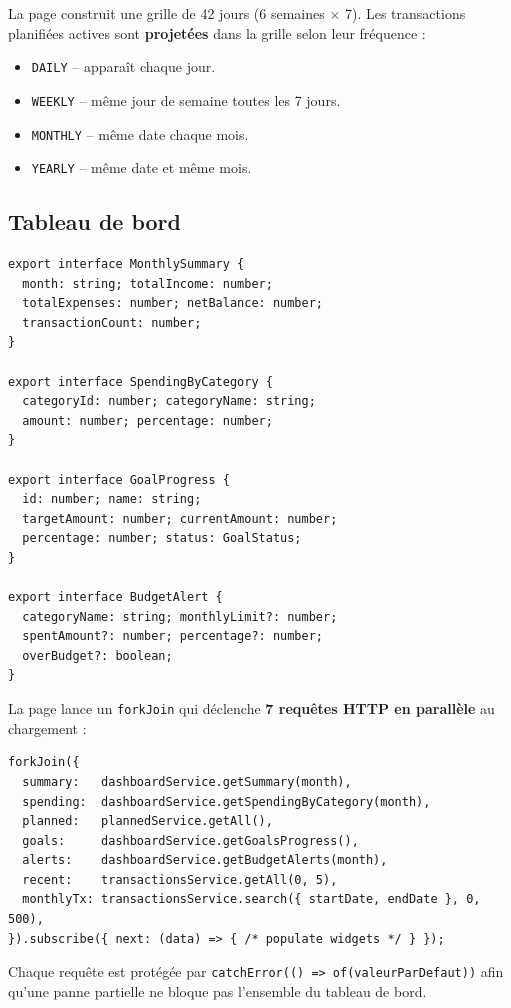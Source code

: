 \documentclass[12pt,a4paper]{article}
\begin{document}
La page construit une grille de 42 jours (6 semaines × 7). Les transactions
planifiées actives sont \textbf{projetées} dans la grille selon leur fréquence :
\begin{itemize}
  \item \texttt{DAILY} -- apparaît chaque jour.
  \item \texttt{WEEKLY} -- même jour de semaine toutes les 7 jours.
  \item \texttt{MONTHLY} -- même date chaque mois.
  \item \texttt{YEARLY} -- même date et même mois.
\end{itemize}

\subsection{Tableau de bord}

\begin{lstlisting}
export interface MonthlySummary {
  month: string; totalIncome: number;
  totalExpenses: number; netBalance: number;
  transactionCount: number;
}

export interface SpendingByCategory {
  categoryId: number; categoryName: string;
  amount: number; percentage: number;
}

export interface GoalProgress {
  id: number; name: string;
  targetAmount: number; currentAmount: number;
  percentage: number; status: GoalStatus;
}

export interface BudgetAlert {
  categoryName: string; monthlyLimit?: number;
  spentAmount?: number; percentage?: number;
  overBudget?: boolean;
}
\end{lstlisting}

La page lance un \texttt{forkJoin} qui déclenche \textbf{7 requêtes HTTP en parallèle}
au chargement :

\begin{lstlisting}
forkJoin({
  summary:   dashboardService.getSummary(month),
  spending:  dashboardService.getSpendingByCategory(month),
  planned:   plannedService.getAll(),
  goals:     dashboardService.getGoalsProgress(),
  alerts:    dashboardService.getBudgetAlerts(month),
  recent:    transactionsService.getAll(0, 5),
  monthlyTx: transactionsService.search({ startDate, endDate }, 0, 500),
}).subscribe({ next: (data) => { /* populate widgets */ } });
\end{lstlisting}

Chaque requête est protégée par \texttt{catchError(() => of(valeurParDefaut))} afin
qu'une panne partielle ne bloque pas l'ensemble du tableau de bord.
\end{document}

